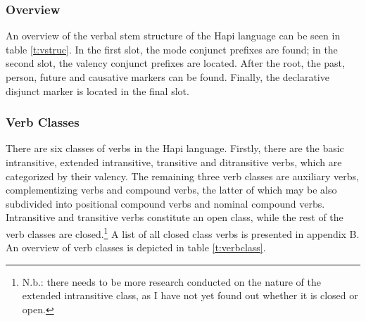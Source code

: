 \documentclass[a4paper, 12pt, oneside]{memoir}
\begin{document}
\subsubsection{Overview}
An overview of the verbal stem structure of the Hapi language can be seen in table \ref{t:vstruc}. In the first slot, the mode conjunct prefixes are found; in the second slot, the valency conjunct prefixes are located. After the root, the past, person, future and causative markers can be found. Finally, the declarative disjunct marker is located in the final slot.
\begin{table}[p!]
    \centering
\caption{Verbal Stem Structure}
\label{t:vstruc}
\end{table}
\subsubsection{Verb Classes}\label{s:verbclass}
There are six classes of verbs in the Hapi language. Firstly, there are the basic intransitive, extended intransitive, transitive and ditransitive verbs, which are categorized by their valency. The remaining three verb classes are auxiliary verbs, complementizing verbs and compound verbs, the latter of which may be also subdivided into positional compound verbs and nominal compound verbs. Intransitive and transitive verbs constitute an open class, while the rest of the verb classes are closed.\footnote{N.b.: there needs to be more research conducted on the nature of the extended intransitive class, as I have not yet found out whether it is closed or open.} A list of all closed class verbs is presented in appendix B. An overview of verb classes is depicted in table \ref{t:verbclass}.
\end{document}
